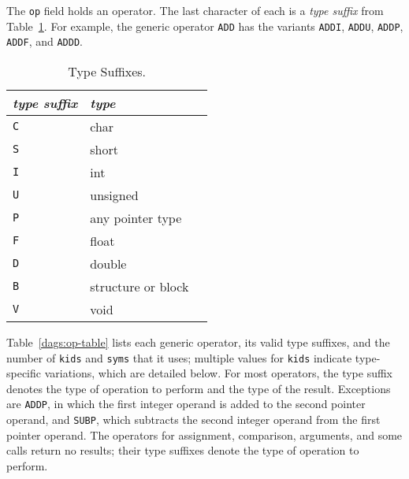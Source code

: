 The \verb|op| field holds an operator. The last character of each is a
{\em type suffix} from Table~\ref{dags:suffix-table}.
For example, the generic operator \verb|ADD| has the variants
\verb|ADDI|, \verb|ADDU|, \verb|ADDP|, \verb|ADDF|, and \verb|ADDD|.

\begin{table}
\begin{center}
\begin{tabular}{lll}
\em type suffix	& \em type \\ \hline
\tt C		& char \\
\tt S		& short \\
\tt I		& int \\
\tt U		& unsigned \\
\tt P		& any pointer type \\
\tt F		& float \\
\tt D		& double \\
\tt B		& structure or block \\
\tt V		& void \\
\end{tabular}
\end{center}
\caption{Type Suffixes.\label{dags:suffix-table}}
\end{table}

Table~\ref{dags:op-table} lists each generic operator, its valid type
suffixes, and the number of \verb|kids| and \verb|syms| that it uses;
multiple values for \verb|kids| indicate type-specific variations,
which are detailed below.  For most operators, the type suffix denotes
the type of operation to perform and the type of the result.
Exceptions are \verb|ADDP|, in which the first integer operand
is added to the second pointer operand, and \verb|SUBP|, which
subtracts the second integer operand from the first pointer operand.
The operators for assignment, comparison, arguments, and some calls return
no results; their type suffixes denote the type of operation to perform.

